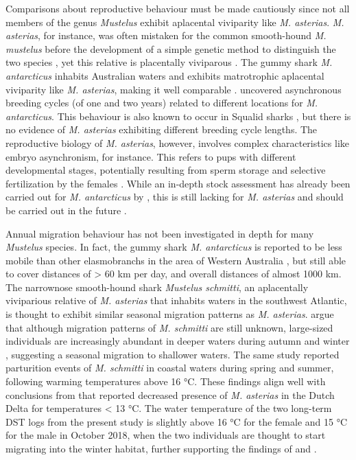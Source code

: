 \documentclass[
  authoryear,
  review,
  3p]{elsarticle}
\begin{document}
Comparisons about reproductive behaviour must be made cautiously since
not all members of the genus \emph{Mustelus} exhibit aplacental
viviparity like \emph{M. asterias}. \emph{M. asterias}, for instance,
was often mistaken for the common smooth-hound \emph{M. mustelus} before
the development of a simple genetic method to distinguish the two
species \citep{farrell_2009}, yet this relative is placentally
viviparous \citep{dasilva_2018}. The gummy shark \emph{M. antarcticus}
inhabits Australian waters and exhibits matrotrophic aplacental
viviparity like \emph{M. asterias}, making it well comparable
\citep{walker_2007}. \citet{walker_2007} uncovered asynchronous breeding
cycles (of one and two years) related to different locations for
\emph{M. antarcticus}. This behaviour is also known to occur in Squalid
sharks \citep{braccini_2006}, but there is no evidence of \emph{M.
asterias} exhibiting different breeding cycle lengths. The reproductive
biology of \emph{M. asterias}, however, involves complex characteristics
like embryo asynchronism, for instance. This refers to pups with
different developmental stages, potentially resulting from sperm storage
and selective fertilization by the females \citep{farrell_2010a}. While
an in-depth stock assessment has already been carried out for \emph{M.
antarcticus} by \citet{pribac_2005}, this is still lacking for \emph{M.
asterias} and should be carried out in the future
\citep{mccullyphillips_2015}.

Annual migration behaviour has not been investigated in depth for many
\emph{Mustelus} species. In fact, the gummy shark \emph{M. antarcticus}
is reported to be less mobile than other elasmobranchs in the area of
Western Australia \citep[according to a three-year acoustic monitoring
study involving 100 tagged \emph{M. antarcticus},][]{braccini_2017}, but
still able to cover distances of \textgreater{} 60 km per day, and
overall distances of almost 1000 km. The narrownose smooth-hound shark
\emph{Mustelus schmitti}, an aplacentally viviparious relative of
\emph{M. asterias} that inhabits waters in the southwest Atlantic, is
thought to exhibit similar seasonal migration patterns as \emph{M.
asterias}. \citet{elisio_2019} argue that although migration patterns of
\emph{M. schmitti} are still unknown, large-sized individuals are
increasingly abundant in deeper waters during autumn and winter
\citep{cortes_2011}, suggesting a seasonal migration to shallower
waters. The same study reported parturition events of \emph{M. schmitti}
in coastal waters during spring and summer, following warming
temperatures above 16 °C. These findings align well with conclusions
from \citet{breve_2016} that reported decreased presence of \emph{M.
asterias} in the Dutch Delta for temperatures \textless{} 13 °C. The
water temperature of the two long-term DST logs from the present study
is slightly above 16 °C for the female and 15 °C for the male in October
2018, when the two individuals are thought to start migrating into the
winter habitat, further supporting the findings of \citet{breve_2016}
and \citet{elisio_2019}.
\end{document}
